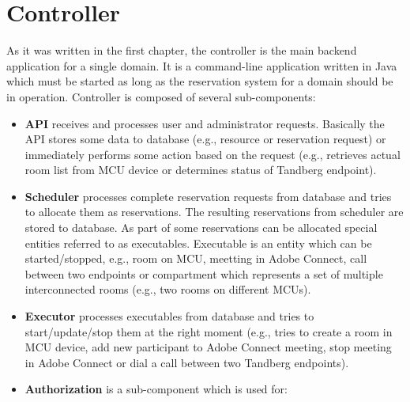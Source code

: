 \chapter{Controller}

As it was written in the first chapter, the controller is the main backend application for a single domain. It is a command-line application written in Java which must be started as long as the reservation system for a domain should be in operation.
Controller is composed of several sub-components:

\begin{itemize}

\item \textbf{API} receives and processes user and administrator requests. Basically the API stores some data to database (e.g., resource or reservation request) or immediately performs some action based on the request (e.g., retrieves actual room list from MCU device or determines status of Tandberg endpoint).

\item \textbf{Scheduler} processes complete reservation requests from database and tries to allocate them as reservations. The resulting reservations from scheduler are stored to database. As part of some reservations can be allocated special entities referred to as executables. Executable is an entity which can be started/stopped, e.g., room on MCU, meetting in Adobe Connect, call between two endpoints or compartment which represents a set of multiple interconnected rooms (e.g., two rooms on different MCUs).

\item \textbf{Executor} processes executables from database and tries to start/update/stop them at the right moment (e.g., tries to create a room in MCU device, add new participant to Adobe Connect meeting, stop meeting in Adobe Connect or dial a call between two Tandberg endpoints).

\item \textbf{Authorization} is a sub-component which is used for:

\end{itemize}

